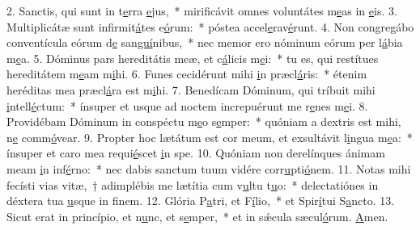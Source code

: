 2. Sanctis, qui sunt in t\uline{e}rra \uline{e}jus,~* mirificávit omnes voluntátes m\uline{e}as in \uline{e}is.
3. Multiplicátæ sunt infirmit\uline{á}tes e\uline{ó}rum:~* póstea accel\uline{e}rav\uline{é}runt.
4. Non congregábo conventícula eórum d\uline{e} san\uline{guí}nibus,~* nec memor ero nóminum eórum per l\uline{á}bia m\uline{e}a.
5. Dóminus pars hereditátis meæ, et c\uline{á}licis m\uline{e}i:~* tu es, qui restítues hereditátem m\uline{e}am m\uline{i}hi.
6. Funes cecidérunt mihi \uline{i}n præcl\uline{á}ris:~* étenim heréditas mea præcl\uline{á}ra est m\uline{i}hi.
7. Benedícam Dóminum, qui tríbuit mihi \uline{i}ntell\uline{é}ctum:~* ínsuper et usque ad noctem increpuérunt me r\uline{e}nes m\uline{e}i.
8. Providébam Dóminum in conspéctu m\uline{e}o s\uline{e}mper:~* quóniam a dextris est mihi, n\uline{e} comm\uline{ó}vear.
9. Propter hoc lætátum est cor meum, et exsultávit l\uline{i}ngua m\uline{e}a:~* ínsuper et caro mea requi\uline{é}scet \uline{i}n spe.
10. Quóniam non derelínques ánimam meam \uline{i}n inf\uline{é}rno:~* nec dabis sanctum tuum vidére corr\uline{u}pti\uline{ó}nem.
11. Notas mihi fecísti vias vitæ,~† adimplébis me lætítia cum v\uline{u}ltu t\uline{u}o:~* delectatiónes in déxtera tua \uline{u}sque in f\uline{i}nem.
12. Glória P\uline{a}tri, et F\uline{í}lio,~* et Spir\uline{í}tui S\uline{a}ncto.
13. Sicut erat in princípio, et n\uline{u}nc, et s\uline{e}mper,~* et in sǽcula sæcul\uline{ó}rum. \uline{A}men.
